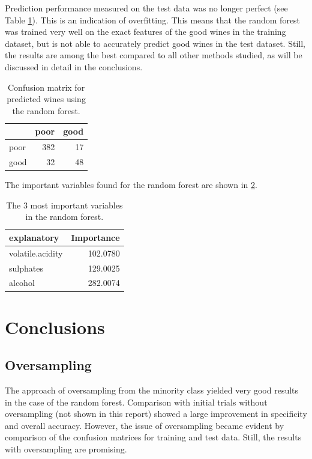 \documentclass[11pt,]{article}
\begin{document}
Prediction performance measured on the test data was no longer perfect
(see Table \ref{tab:ranforconftest}). This is an indication of
overfitting. This means that the random forest was trained very well on
the exact features of the good wines in the training dataset, but is not
able to accurately predict good wines in the test dataset. Still, the
results are among the best compared to all other methods studied, as
will be discussed in detail in the conclusions.

\begin{table}[!h]

\caption{\label{tab:ranforconftest}Confusion matrix for predicted wines using the random forest.}
\centering
\begin{tabular}[t]{lrr}
\toprule
  & poor & good\\
\midrule
poor & 382 & 17\\
good & 32 & 48\\
\bottomrule
\end{tabular}
\end{table}

The important variables found for the random forest are shown in
\ref{tab:rfimportantvars}.

\begin{table}[!h]

\caption{\label{tab:rfimportantvars}The 3 most important variables in the random forest.}
\centering
\begin{tabular}[t]{lr}
\toprule
explanatory & Importance\\
\midrule
volatile.acidity & 102.0780\\
sulphates & 129.0025\\
alcohol & 282.0074\\
\bottomrule
\end{tabular}
\end{table}

\hypertarget{conclusions}{%
\section{Conclusions}\label{conclusions}}

\hypertarget{oversampling}{%
\subsection{Oversampling}\label{oversampling}}

The approach of oversampling from the minority class yielded very good
results in the case of the random forest. Comparison with initial trials
without oversampling (not shown in this report) showed a large
improvement in specificity and overall accuracy. However, the issue of
oversampling became evident by comparison of the confusion matrices for
training and test data. Still, the results with oversampling are
promising.
\end{document}
